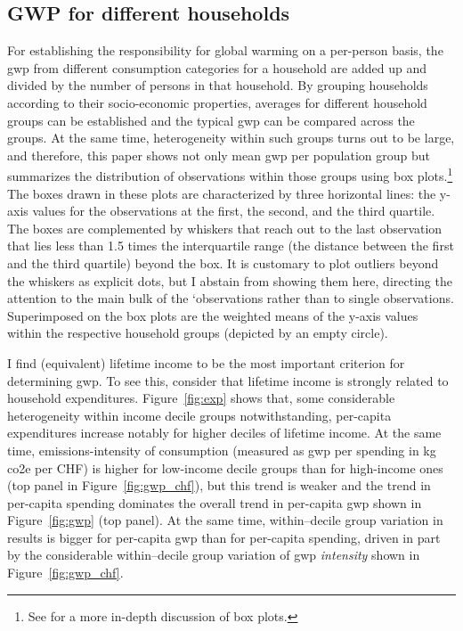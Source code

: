 \documentclass[a4paper,11pt,abstract=true]{scrartcl}
\begin{document}

\subsection{{GWP} for different households}

For establishing the responsibility for global warming on a per-person basis, the \ac{gwp} from different consumption categories for a household are added up and divided by the number of persons in that household.
By grouping households according to their socio-economic properties, averages for different household groups can be established and the typical \ac{gwp} can be compared across the groups.
At the same time, heterogeneity within such groups turns out to be large, and therefore, this paper shows not only mean \ac{gwp} per population group but summarizes the distribution of observations within those groups using box plots.\footnote{%
  See \citet{krzywinski_visualizing_2014} for a more in-depth discussion of box plots.}
The boxes drawn in these plots are characterized by three horizontal lines: the y-axis values for the observations at the first, the second, and the third quartile.
The boxes are complemented by whiskers that reach out to the last observation that lies less than 1.5 times the interquartile range (the distance between the first and the third quartile) beyond the box.
It is customary to plot outliers beyond the whiskers as explicit dots, but I abstain from showing them here, directing the attention to the main bulk of the `observations rather than to single observations.
Superimposed on the box plots are the weighted means of the y-axis values within the respective household groups (depicted by an empty circle).

I find (equivalent) lifetime income to be the most important criterion for determining \ac{gwp}.
To see this, consider that lifetime income is strongly related to household expenditures.
Figure~\ref{fig:exp} shows that, some considerable heterogeneity within income decile groups notwithstanding, per-capita expenditures increase notably for higher deciles of lifetime income.
At the same time, emissions-intensity of consumption (measured as \ac{gwp} per spending in kg \ac{co2e} per CHF) is higher for low-income decile groups than for high-income ones (top panel in Figure~\ref{fig:gwp_chf}), but this trend is weaker and the trend in per-capita spending dominates the overall trend in per-capita \ac{gwp} shown in Figure~\ref{fig:gwp} (top panel).
At the same time, within--decile group variation in results is bigger for per-capita \ac{gwp} than for per-capita spending, driven in part by the considerable within--decile group variation of \ac{gwp} \emph{intensity} shown in Figure~\ref{fig:gwp_chf}.
\end{document}
